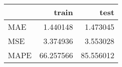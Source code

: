 \begin{tabular}{lrr}
\toprule
{} &      train &       test \\
\midrule
MAE  &   1.440148 &   1.473045 \\
MSE  &   3.374936 &   3.553028 \\
MAPE &  66.257566 &  85.556012 \\
\bottomrule
\end{tabular}
